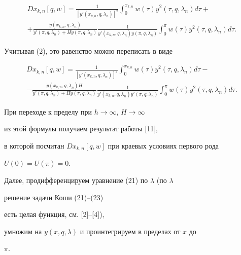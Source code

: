 \begin{pf}
\begin{multline} 


D x_{k,n}[q,w]=\frac{1}{[y'(x_{k,n},q,\lambda_n)]^2} 


\int^{x_{k,n}}_0 w(\tau)y^2(\tau,q,\lambda_n)d\tau+ \\ 


% 


+\frac{\Dot y(x_{k,n},q,\lambda_n)} 


{\Dot y'(\pi,q,\lambda_n)+H\Dot y(\pi,q,\lambda_n)} 


\frac{1}{y'(x_{k,n},q,\lambda_n)y(\pi,q,\lambda_n)} 


\int^\pi_0 w(\tau)y^2(\tau,q,\lambda_n)d\tau. 


\end{multline} 


Учитывая (2), это равенство можно переписать в виде 


\begin{multline*} 


D x_{k,n}[q,w]=\frac{1}{[y'(x_{k,n},q,\lambda_n)]^2} 


\int^{x_{k,n}}_0 w(\tau)y^2(\tau,q,\lambda_n)d\tau- \\ 


% 


-\frac{\Dot y(x_{k,n},q,\lambda_n)H} 


{\Dot y'(\pi,q,\lambda_n)+H\Dot y(\pi,q,\lambda_n)} 


\frac{1}{y'(x_{k,n},q,\lambda_n)y'(\pi,q,\lambda_n)} 


\int^\pi_0 w(\tau)y^2(\tau,q,\lambda_n)d\tau. 


\end{multline*} 


При переходе к пределу при $h\to\infty$, $H\to\infty$ 


из этой формулы получаем результат работы [11], 


в которой посчитан $D x_{k,n}[q,w]$ при краевых условиях первого рода 


$U(0)=U(\pi)=0$. 


 


Далее, продифференцируем уравнение (21) по $\lambda$ (по $\lambda$ 


решение задачи Коши (21)--(23) 


есть целая функция, см. [2]--[4]), 


умножим на $y(x,q,\lambda)$ и проинтегрируем в пределах от $x$ до 


$\pi$. 



\end{pf}
